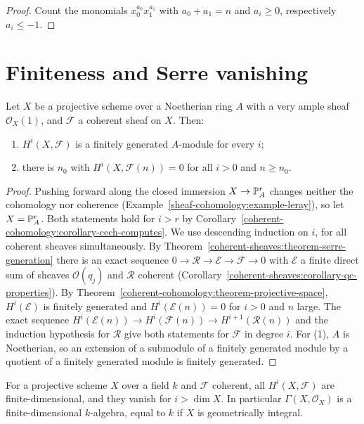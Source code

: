 \begin{proof}
Count the monomials $x_0^{a_0}x_1^{a_1}$ with $a_0 + a_1 = n$ and $a_i \geq 0$, respectively $a_i \leq -1$.
\end{proof}

\section{Finiteness and Serre vanishing}\label{coherent-cohomology:section-finiteness}

\begin{theorem}[Serre]\label{coherent-cohomology:theorem-finiteness}
Let $X$ be a projective scheme over a Noetherian ring $A$ with a very ample sheaf $\mathcal{O}_X(1)$, and $\mathcal{F}$ a coherent sheaf on $X$. Then:
\begin{enumerate}
\item $H^i(X, \mathcal{F})$ is a finitely generated $A$-module for every $i$;
\item there is $n_0$ with $H^i(X, \mathcal{F}(n)) = 0$ for all $i > 0$ and $n \geq n_0$.
\end{enumerate}
\end{theorem}

\begin{proof}
Pushing forward along the closed immersion $X \to \mathbb{P}^r_A$ changes neither the cohomology nor coherence (Example~\ref{sheaf-cohomology:example-leray}), so
let $X = \mathbb{P}^r_A$. Both statements hold for $i > r$ by Corollary~\ref{coherent-cohomology:corollary-cech-computes}. We use descending induction on $i$, for all
coherent sheaves simultaneously. By Theorem~\ref{coherent-sheaves:theorem-serre-generation} there is an exact sequence $0 \to \mathcal{R} \to \mathcal{E} \to \mathcal{F} \to 0$
with $\mathcal{E}$ a finite direct sum of sheaves $\mathcal{O}(q_j)$ and $\mathcal{R}$ coherent (Corollary~\ref{coherent-sheaves:corollary-qc-properties}). By
Theorem~\ref{coherent-cohomology:theorem-projective-space}, $H^i(\mathcal{E})$ is finitely generated and $H^i(\mathcal{E}(n)) = 0$ for $i > 0$ and $n$ large. The exact
sequence $H^i(\mathcal{E}(n)) \to H^i(\mathcal{F}(n)) \to H^{i+1}(\mathcal{R}(n))$ and the induction hypothesis for $\mathcal{R}$ give both statements for $\mathcal{F}$ in degree
$i$. For (1), $A$ is Noetherian, so an extension of a submodule of a finitely generated module by a quotient of a finitely generated module is
finitely generated.
\end{proof}

\begin{corollary}\label{coherent-cohomology:corollary-finite-dimensional}
For a projective scheme $X$ over a field $k$ and $\mathcal{F}$ coherent, all $H^i(X, \mathcal{F})$ are finite-dimensional, and they vanish for $i > \dim X$. In particular
$\Gamma(X, \mathcal{O}_X)$ is a finite-dimensional $k$-algebra, equal to $k$ if $X$ is geometrically integral.
\end{corollary}

